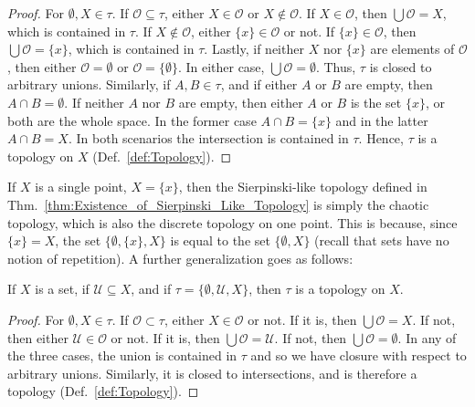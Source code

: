     \begin{proof}
        For $\emptyset,X\in\tau$. If $\mathcal{O}\subseteq\tau$, either
        $X\in\mathcal{O}$ or $X\notin\mathcal{O}$. If $X\in\mathcal{O}$, then
        $\bigcup\mathcal{O}=X$, which is contained in $\tau$. If
        $X\notin\mathcal{O}$, either $\{x\}\in\mathcal{O}$ or not. If
        $\{x\}\in\mathcal{O}$, then $\bigcup\mathcal{O}=\{x\}$, which is
        contained in $\tau$. Lastly, if neither $X$ nor $\{x\}$ are elements of
        $\mathcal{O}$, then either $\mathcal{O}=\emptyset$ or
        $\mathcal{O}=\{\emptyset\}$. In either case,
        $\bigcup\mathcal{O}=\emptyset$. Thus, $\tau$ is closed to arbitrary
        unions. Similarly, if $A,B\in\tau$, and if either $A$ or $B$ are empty,
        then $A\cap{B}=\emptyset$. If neither $A$ nor $B$ are empty, then
        either $A$ or $B$ is the set $\{x\}$, or both are the whole space. In
        the former case $A\cap{B}=\{x\}$ and in the latter $A\cap{B}=X$. In
        both scenarios the intersection is contained in $\tau$. Hence,
        $\tau$ is a topology on $X$ (Def.~\ref{def:Topology}).
    \end{proof}
    If $X$ is a single point, $X=\{x\}$, then the Sierpinski-like topology
    defined in Thm.~\ref{thm:Existence_of_Sierpinski_Like_Topology} is simply
    the chaotic topology, which is also the discrete topology on one point.
    This is because, since $\{x\}=X$, the set $\{\emptyset,\{x\},X\}$ is equal
    to the set $\{\emptyset,X\}$ (recall that sets have no notion of
    repetition). A further generalization goes as follows:
    \begin{theorem}
        \label{thm:Existence_of_Generalized_Sierpinski_Like_Topology}
        If $X$ is a set, if $\mathcal{U}\subseteq{X}$, and if
        $\tau=\{\emptyset,\mathcal{U},X\}$, then $\tau$ is a topology
        on $X$.
    \end{theorem}
    \begin{proof}
        For $\emptyset,X\in\tau$. If $\mathcal{O}\subset\tau$, either
        $X\in\mathcal{O}$ or not. If it is, then $\bigcup\mathcal{O}=X$.
        If not, then either $\mathcal{U}\in\mathcal{O}$ or not. If it is,
        then $\bigcup\mathcal{O}=\mathcal{U}$. If not, then
        $\bigcup\mathcal{O}=\emptyset$. In any of the three cases, the union is
        contained in $\tau$ and so we have closure with respect to arbitrary
        unions. Similarly, it is closed to intersections, and is therefore a
        topology (Def.~\ref{def:Topology}).
    \end{proof}
